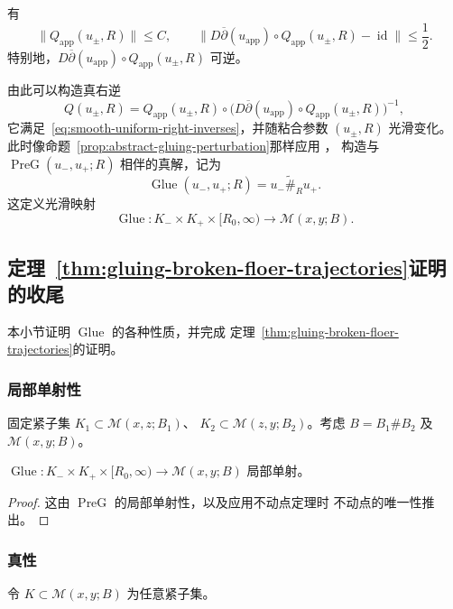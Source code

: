 \begin{proposition}
\label{prop:approximate-right-inverse-uniform}
有
\[
 \|Q_{\mathrm{app}}(u_\pm,R)\|\leq C,
 \qquad
 \|D\overline\partial(u_{\mathrm{app}})\circ
 Q_{\mathrm{app}}(u_\pm,R)-\operatorname{id}\|\leq\frac12.
\]
特别地，$D\overline\partial(u_{\mathrm{app}})\circ
Q_{\mathrm{app}}(u_\pm,R)$ 可逆。
\end{proposition}

由此可以构造真右逆
\[
 Q(u_\pm,R)=Q_{\mathrm{app}}(u_\pm,R)\circ
 \bigl(D\overline\partial(u_{\mathrm{app}})\circ
 Q_{\mathrm{app}}(u_\pm,R)\bigr)^{-1},
\]
它满足~\eqref{eq:smooth-uniform-right-inverses}，并随粘合参数 $(u_\pm,R)$ 光滑变化。
此时像命题~\ref{prop:abstract-gluing-perturbation}那样应用\personPicard{} \termContractionMappingTheorem{}，
构造与 $\operatorname{PreG}(u_-,u_+;R)$ 相伴的真解，记为
\[
 \operatorname{Glue}(u_-,u_+;R)=u_-\widetilde{\#}_Ru_+.
\]
这定义光滑映射
\[
 \operatorname{Glue}:K_-\times K_+\times[R_0,\infty)
 \longrightarrow\mathcal M(x,y;B).
\]

\subsection{定理~\ref{thm:gluing-broken-floer-trajectories}证明的收尾}
\label{subsec:wrap-up-gluing-theorem}

本小节证明\termGluingMap{} $\operatorname{Glue}$ 的各种性质，并完成
定理~\ref{thm:gluing-broken-floer-trajectories}的证明。

\subsubsection*{局部单射性}
固定紧子集 $K_1\subset\mathcal M(x,z;B_1)$、
$K_2\subset\mathcal M(z,y;B_2)$。考虑 $B=B_1\#B_2$ 及
$\mathcal M(x,y;B)$。

\begin{proposition}
\label{prop:glue-local-injectivity}
$\operatorname{Glue}:K_-\times K_+\times[R_0,\infty)\to\mathcal M(x,y;B)$
局部单射。
\end{proposition}

\begin{proof}
这由\termPreGluingMap{} $\operatorname{PreG}$ 的局部单射性，以及应用\personPicard{}不动点定理时
不动点的唯一性推出。
\end{proof}

\subsubsection*{真性}
令 $K\subset\mathcal M(x,y;B)$ 为任意紧子集。

